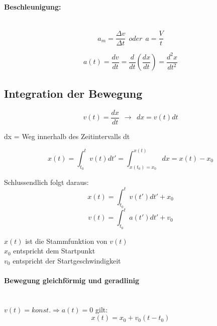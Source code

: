 \documentclass[7pt]{article}
\begin{document}
\begin{multicols*}{3}
\paragraph{Beschleunigung:}\mbox{} \\
\begin{equation*}
	a_m = \frac{{\Delta}v}{{\Delta}t} \>\>oder\>\> a = \frac{V}{t}
\end{equation*}

\begin{equation*}
a(t) = \frac{dv}{dt} = \frac{d}{dt} \left(\frac{dx}{dt}\right) = \frac{d^2x}{dt^2}
\end{equation*}


\subsection{Integration der Bewegung}
\begin{equation*}
	v(t) = \frac{dx}{dt} \>\> \rightarrow \>\> dx = v(t)dt
\end{equation*}
\begin{center}
dx =  Weg innerhalb des Zeitintervalls dt\newline
\end{center}

\begin{equation*}
	x(t) = \int_{t_0}^{t}v(t)dt' = \int_{x(t_0)=x_0}^{x(t)}dx = x(t) - x_0
\end{equation*}
\newline

Schlussendlich folgt daraus:
\begin{equation*}
	x(t) = \int_{t_0}^{t}v(t')dt' + x_0
\end{equation*}
\begin{equation*}
	v(t) = \int_{t_0}^{t}a(t')dt' + v_0
\end{equation*}

$x(t)$ ist die Stammfunktion von $v(t)$ \\
$x_0$ entspricht dem Startpunkt \\
$v_0$ entspricht der Startgeschwindigkeit\newline

\paragraph{Bewegung gleichf{\"o}rmig und geradlinig}\mbox{} \\
$v(t) = konst. \Rightarrow a(t) = 0$ gilt:\newline
\begin{equation*}
	x(t) = x_0 + v_0(t - t_0)
\end{equation*}

\end{multicols*}
\end{document}

